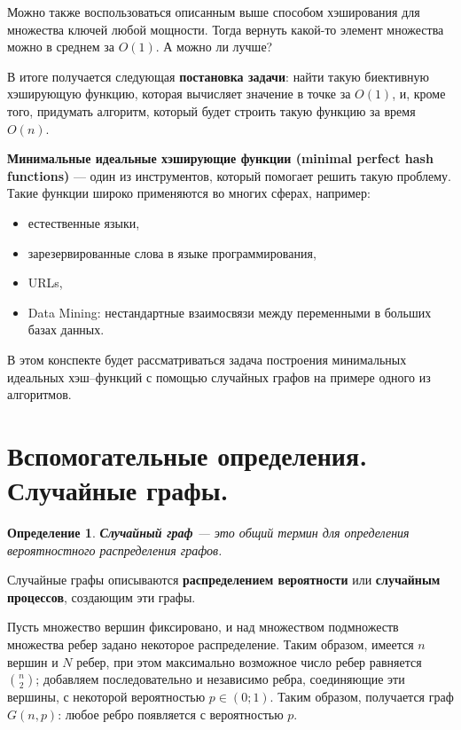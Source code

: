 \documentclass[specialist,
               substylefile = spbu.rtx,
               subf,href,colorlinks=true, 12pt]{disser}
\newtheorem{mydef}{Определение}
\begin{document}
Можно также воспользоваться описанным выше способом хэширования для множества ключей любой мощности. Тогда вернуть какой-то элемент множества можно в среднем за $\mathit{O}(1)$. А можно ли лучше?

В итоге получается следующая \textbf{постановка задачи}: найти такую биективную хэширующую функцию, которая вычисляет значение в точке за $\mathit{O}(1)$, и, кроме того, придумать алгоритм, который будет строить такую функцию за время $\mathit{O}(n)$.

\textbf{Минимальные идеальные хэширующие функции (minimal perfect hash functions)} --- один из инструментов, который помогает решить такую проблему. Такие функции широко применяются во многих сферах, например:

\begin{itemize}
\item естественные языки,
\item зарезервированные слова в языке программирования,
\item URLs,
\item Data Mining: нестандартные взаимосвязи между переменными в больших базах данных.
\end{itemize}

В этом конспекте будет рассматриваться задача построения минимальных идеальных хэш--функций с помощью случайных графов на примере одного из алгоритмов.

\newpage

\section{Вспомогательные определения. Случайные графы.}

\begin{mydef}
\textbf{Случайный граф} --- это общий термин для определения вероятностного распределения графов.
\end{mydef}

Случайные графы описываются \textbf{распределением вероятности} или \textbf{случайным процессов}, создающим эти графы.

Пусть множество вершин фиксировано, и над множеством подмножеств множества ребер задано некоторое распределение. Таким образом, имеется $n$ вершин и  $N$ ребер, при этом максимально возможное число ребер равняется $\binom{n}{2}$; добавляем последовательно и независимо ребра, соединяющие эти вершины, с некоторой вероятностью $p \in (0;1)$. Таким образом, получается граф $G(n,p)$: любое ребро появляется с вероятностью $p$.
\end{document}
